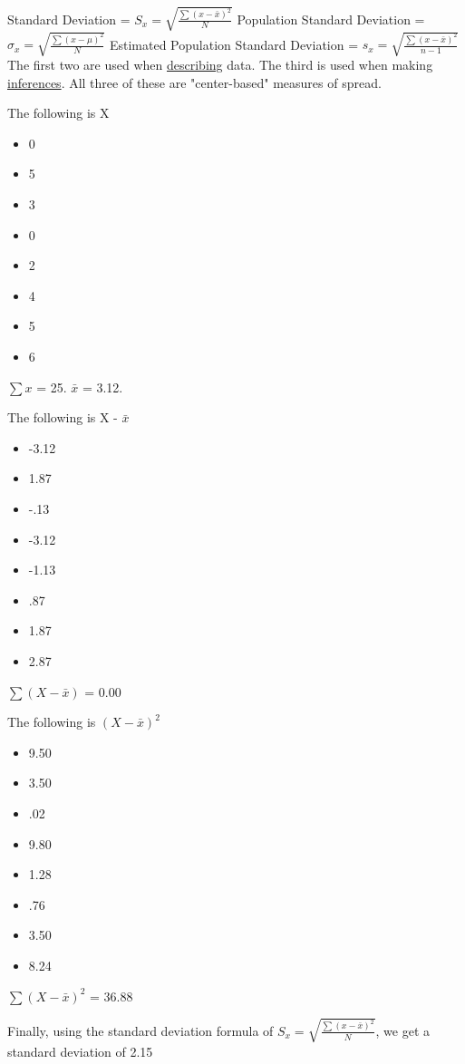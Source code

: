 \documentclass[11pt]{report}
\begin{document}
\noindent Standard Deviation = $S_x = \sqrt{\frac{\sum(x - \bar{x})^2}{N}}$
\newline
Population Standard Deviation = $\sigma_x = \sqrt{\frac{\sum(x - \mu)^2}{N}}$
\newline 
Estimated Population Standard Deviation = $s_x = \sqrt{\frac{\sum(x - \bar{x})^2}{n-1}}$
\newline\newline
The first two are used when \underline{describing} data. The third is used when making \underline{inferences}. All three of these are "center-based" measures of spread. 

{
    \begin{multicols}{3}
        The following is X
        \begin{itemize}
            \item 0
            \item 5
            \item 3
            \item 0
            \item 2
            \item 4
            \item 5
            \item 6
        \end{itemize}
        $\sum x$ = 25. $\bar{x}$ = 3.12.

        \columnbreak
        The following is X - $\bar{x}$
        \begin{itemize}
            \item -3.12
            \item 1.87
            \item -.13
            \item -3.12
            \item -1.13
            \item .87
            \item 1.87
            \item 2.87
        \end{itemize}
        $\sum(X - \bar{x})$ = 0.00

        \columnbreak
        The following is $(X - \bar{x})^2$
        \begin{itemize}
            \item 9.50
            \item 3.50
            \item .02
            \item 9.80
            \item 1.28
            \item .76
            \item 3.50
            \item 8.24
        \end{itemize}
        $\sum(X - \bar{x})^2$ = 36.88
    \end{multicols}
    Finally, using the standard deviation formula of $S_x = \sqrt{\frac{\sum(x - \bar{x})^2}{N}}$, we get a standard deviation of 2.15
}
\end{document}
